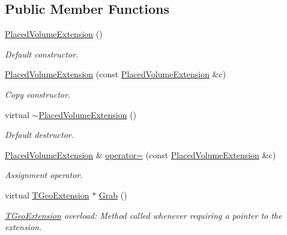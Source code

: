 \subsection*{Public Member Functions}
\begin{DoxyCompactItemize}
\item 
\hyperlink{class_d_d4hep_1_1_geometry_1_1_placed_volume_extension_a1a86dc8c412bb00df13a4fb56c0958bf}{Placed\+Volume\+Extension} ()
\begin{DoxyCompactList}\small\item\em Default constructor. \end{DoxyCompactList}\item 
\hyperlink{class_d_d4hep_1_1_geometry_1_1_placed_volume_extension_ae6ed2e13f9d86072e773573b7d710e1b}{Placed\+Volume\+Extension} (const \hyperlink{class_d_d4hep_1_1_geometry_1_1_placed_volume_extension}{Placed\+Volume\+Extension} \&c)
\begin{DoxyCompactList}\small\item\em Copy constructor. \end{DoxyCompactList}\item 
virtual \hyperlink{class_d_d4hep_1_1_geometry_1_1_placed_volume_extension_a99c666d418ebb75722ab794442169d72}{$\sim$\+Placed\+Volume\+Extension} ()
\begin{DoxyCompactList}\small\item\em Default destructor. \end{DoxyCompactList}\item 
\hyperlink{class_d_d4hep_1_1_geometry_1_1_placed_volume_extension}{Placed\+Volume\+Extension} \& \hyperlink{class_d_d4hep_1_1_geometry_1_1_placed_volume_extension_a946b4a4989ea4116a396dffd3886dbd0}{operator=} (const \hyperlink{class_d_d4hep_1_1_geometry_1_1_placed_volume_extension}{Placed\+Volume\+Extension} \&c)
\begin{DoxyCompactList}\small\item\em Assignment operator. \end{DoxyCompactList}\item 
virtual \hyperlink{class_t_geo_extension}{T\+Geo\+Extension} $\ast$ \hyperlink{class_d_d4hep_1_1_geometry_1_1_placed_volume_extension_aa5261b49a18fba980e00d96161db3855}{Grab} ()
\begin{DoxyCompactList}\small\item\em \hyperlink{class_t_geo_extension}{T\+Geo\+Extension} overload\+: Method called whenever requiring a pointer to the extension. \end{DoxyCompactList}\item 

\end{DoxyCompactItemize}
